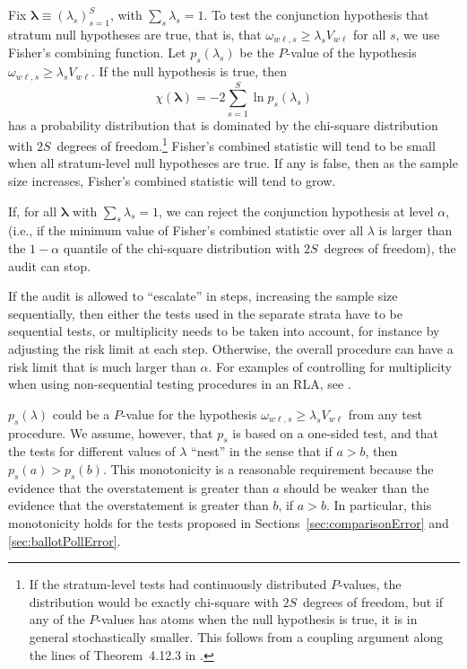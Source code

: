 \documentclass[runningheads]{llncs}
\newcommand{\beq}{\begin{equation}}
\newcommand{\eeq}{\end{equation}}
\begin{document}
Fix $\mathbf{\lambda} \equiv (\lambda_s)_{s=1}^S$, with $\sum_s \lambda_s = 1$.
To test the conjunction hypothesis that stratum null hypotheses are true, that is, that $\omega_{w\ell,s} \ge \lambda_s V_{w\ell}$ for all $s$, we use Fisher's combining function.
Let $p_s(\lambda_s)$ be the $P$-value of the hypothesis $\omega_{w\ell,s} \ge \lambda_s V_{w\ell}$.
If the null hypothesis is true, then 
\beq \label{eq:fisher}
   \chi(\mathbf{\lambda}) = -2 \sum_{s=1}^S \ln p_s(\lambda_s)
\eeq
has a probability distribution that is dominated by the chi-square distribution with $2S$~degrees
of freedom.\footnote{%
   If the stratum-level tests had continuously distributed $P$-values, the distribution would be exactly
   chi-square with $2S$~degrees of freedom, but if any of the $P$-values has atoms when
   the null hypothesis is true, it is in general stochastically smaller.
   This follows from a coupling argument along the lines of Theorem~4.12.3 in \cite{grimmett01}.
}
Fisher's combined statistic will tend to be small when all stratum-level null hypotheses are true.
If any is false, then as the sample size increases, Fisher's combined statistic will tend to grow.

If, for all $\mathbf{\lambda}$ with $\sum_s \lambda_s = 1$, we can reject the conjunction
hypothesis at level $\alpha$, 
(i.e., if the minimum value of Fisher's combined statistic over all $\lambda$ is larger than the $1-\alpha$ quantile of the chi-square
distribution with $2S$~degrees of freedom), the audit can stop. 

If the audit is allowed to ``escalate'' in steps, increasing the sample size sequentially, then either the tests used in the separate strata have to be sequential tests, or multiplicity needs to be taken into account, for instance by adjusting the risk limit at each step.
Otherwise, the overall procedure can have a risk limit that is much larger than $\alpha$.
For examples of controlling for multiplicity when using non-sequential testing procedures in an RLA, see \cite{stark08a,stark09a}.

$p_s(\lambda)$ could be a $P$-value for the hypothesis
$\omega_{w\ell,s} \ge \lambda_s V_{w\ell}$ from any test procedure. 
We assume, however, that $p_s$ is based on a one-sided test, and that the tests
for different values of $\lambda$ ``nest'' in the sense that if $a > b$,
then $p_s(a) > p_s(b)$.
This monotonicity is a reasonable requirement because the evidence that the overstatement
is greater than $a$ should be weaker than the evidence that the overstatement is greater than
$b$, if $a > b$.
In particular, this monotonicity holds for the tests proposed in Sections~\ref{sec:comparisonError}
and \ref{sec:ballotPollError}.
\end{document}
